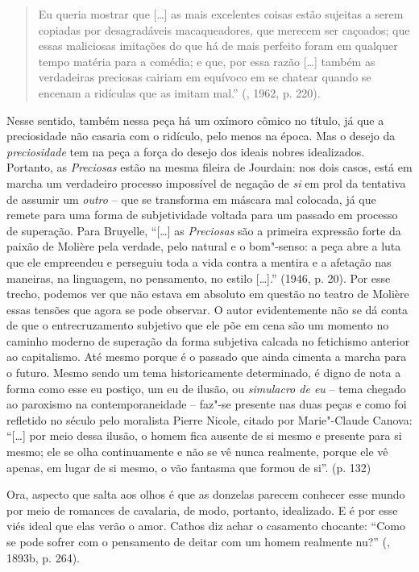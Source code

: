 \begin{quote}
Eu queria mostrar que [\ldots{}] as mais excelentes coisas estão
sujeitas a serem copiadas por desagradáveis macaqueadores, que merecem
ser caçoados; que essas maliciosas imitações do que há de mais perfeito
foram em qualquer tempo matéria para a comédia; e que, por essa razão
[\ldots{}] também as verdadeiras preciosas cairiam em equívoco em se
chatear quando se encenam a ridículas que as imitam mal.'' (,
1962, p. 220).
\end{quote}

Nesse sentido, também nessa peça há um oxímoro cômico no título, já que
a preciosidade não casaria com o ridículo, pelo menos na época. Mas o
desejo da \emph{preciosidade} tem na peça a força do desejo dos ideais
nobres idealizados. Portanto, as \emph{Preciosas} estão na mesma fileira
de Jourdain: nos dois casos, está em marcha um verdadeiro processo
impossível de negação de \emph{si} em prol da tentativa de assumir um
\emph{outro} -- que se transforma em máscara mal colocada, já que remete
para uma forma de subjetividade voltada para um passado em processo de
superação. Para Bruyelle, ``[\ldots{}] as \emph{Preciosas} são a primeira
expressão forte da paixão de Molière pela verdade, pelo natural e o
bom"-senso: a peça abre a luta que ele empreendeu e perseguiu toda a vida
contra a mentira e a afetação nas maneiras, na linguagem, no pensamento,
no estilo [\ldots{}].'' (1946, p. 20). Por esse trecho, podemos ver
que não estava em absoluto em questão no teatro de Molière essas tensões
que agora se pode observar. O autor evidentemente não se dá conta de
que o entrecruzamento subjetivo que ele põe em cena são um momento no
caminho moderno de superação da forma subjetiva calcada no fetichismo
anterior ao capitalismo. Até mesmo porque é o passado que ainda cimenta
a marcha para o futuro. Mesmo sendo um tema historicamente determinado,
é digno de nota a forma como esse eu postiço, um eu de ilusão, ou
\emph{simulacro de eu} -- tema chegado ao paroxismo na contemporaneidade
-- faz"-se presente nas duas peças e como foi refletido no século 
pelo moralista Pierre Nicole, citado por Marie"-Claude Canova:
``[\ldots{}] por meio dessa ilusão, o homem fica ausente de si mesmo
e presente para si mesmo; ele se olha continuamente e não se vê nunca
realmente, porque ele vê apenas, em lugar de si mesmo, o vão fantasma
que formou de si''. (p. 132)

Ora, aspecto que salta aos olhos é que as donzelas parecem conhecer esse
mundo por meio de romances de cavalaria, de modo, portanto, idealizado.
E é por esse viés ideal que elas verão o amor. Cathos diz achar o
casamento chocante: ``Como se pode sofrer com o pensamento de deitar com
um homem realmente nu?'' (, 1893b, p. 264).


